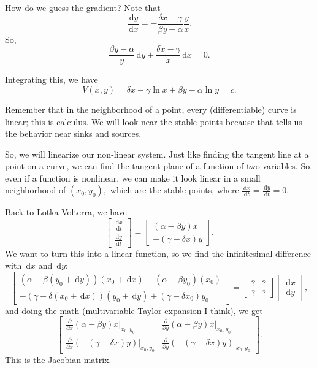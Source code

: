 \documentclass[12pt]{article}
\theoremstyle{remark}
\newcommand{\diffn}[1]{\,\mathrm{d}{#1}}
\newcommand{\fdiffn}[2]{\frac{\diffn{#1}}{\diffn{#2}}}
\begin{document}
How do we guess the gradient?
Note that
\[\fdiffn{y}{x}=-\frac{\delta x-\gamma}{\beta y-\alpha}\frac{y}{x}.\]
So,
\[\frac{\beta y-\alpha}{y}\diffn{y} + \frac{\delta x - \gamma}{x}\diffn{x} = 0.\]

Integrating this, we have
\[V(x,y) = \delta x - \gamma \ln  x + \beta y -\alpha \ln y = c.\]

Remember that in the neighborhood of a point, every (differentiable) curve is linear; this is calculus. We will look near the stable points because that tells us the behavior near sinks and sources.

So, we will linearize our non-linear system. Just like finding the tangent line at a point on a curve, we can find the tangent plane of a function of two variables. So, even if a function is nonlinear, we can make it look linear in a small neighborhood of $(x_0,y_0),$ which are the stable points, where $\fdiffn{x}{t}=\fdiffn{y}{t}=0.$

Back to Lotka-Volterra, we have
\[\begin{bmatrix}
    \fdiffn{x}{t}\\\fdiffn{y}{t}
\end{bmatrix}=\begin{bmatrix}
    (\alpha-\beta y)x\\-(\gamma-\delta x)y
\end{bmatrix}.\]
We want to turn this into a linear function, so we find the infinitesimal difference with $\diffn{x}$ and $\diffn{y}:$
\[
\begin{bmatrix}
    (\alpha - \beta(y_0 + \diffn{y}))(x_0+\diffn{x})-(\alpha - \beta y_0)(x_0) \\
    -(\gamma - \delta(x_0 + \diffn{x}))(y_0+\diffn{y})+(\gamma-\delta x_0)y_0
\end{bmatrix}=\begin{bmatrix}
    ?&?\\?&?
\end{bmatrix}\begin{bmatrix}
    \diffn{x}\\\diffn{y}
\end{bmatrix},\]
and doing the math (multivariable Taylor expansion I think), we get
\[\begin{bmatrix}
    \frac{\partial}{\partial x}(\alpha - \beta y)x\vert_{x_0,y_0}&\frac{\partial}{\partial y}(\alpha-\beta y)x\vert_{x_0,y_0}\\
    \frac{\partial}{\partial x}(-(\gamma - \delta x)y)\vert_{x_0,y_0}&\frac{\partial}{\partial y}( - (\gamma-\delta x)y)|_{x_0,y_0}
\end{bmatrix}.\]
This is the Jacobian matrix.
\end{document}
